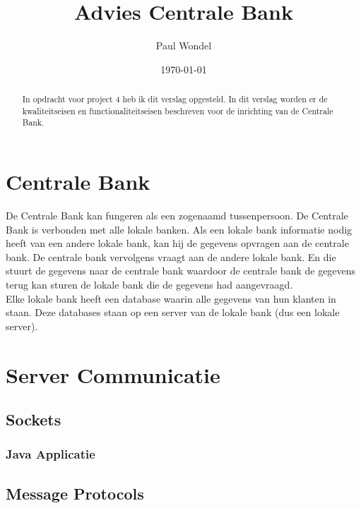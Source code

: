 \documentclass{article}
\begin{document}
\title{Advies Centrale Bank}
\author{Paul Wondel}
\date{\today}
\maketitle

\begin{abstract}
In opdracht voor project 4 heb ik dit verslag opgesteld.
In dit verslag worden er de kwaliteitseisen en functionaliteitseisen
beschreven voor de inrichting van de Centrale Bank.
\end{abstract}

\clearpage

\tableofcontents

\clearpage

\section{Centrale Bank}
De Centrale Bank kan fungeren als een zogenaamd tussenpersoon.
De Centrale Bank is verbonden met alle lokale banken.
Als een lokale bank informatie nodig heeft van een andere lokale bank,
kan hij de gegevens opvragen aan de centrale bank.
De centrale bank vervolgens vraagt aan de andere lokale bank.
En die stuurt de gegevens naar de centrale bank waardoor de centrale bank
de gegevens terug kan sturen de lokale bank die de gegevens had aangevraagd.\\

Elke lokale bank heeft een database waarin alle gegevens van hun klanten in staan.
Deze databases staan op een server van de lokale bank (dus een lokale server).


\section{Server Communicatie}


\subsection{Sockets}

\subsubsection{Java Applicatie}

\subsection{Message Protocols}
\end{document}

